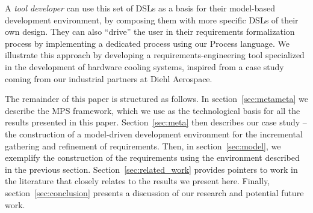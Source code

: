 A \emph{tool developer} can use this set of DSLs as a basis for their
model-based development environment, by composing them with more specific DSLs
of their own design.
They can also ``drive'' the user in their requirements formalization process by
implementing a dedicated process using our \textsf{Process} language.
We illustrate this approach by developing a requirements-engineering tool
specialized in the development of hardware cooling systems, inspired from a case
study coming from our industrial partners at Diehl Aerospace.


The remainder of this paper is structured as follows.  In
section~\ref{sec:metameta} we describe the MPS framework, which we use as the
technological basis for all the results presented in this paper.
Section~\ref{sec:meta} then describes our case study -- the construction of a
model-driven development environment for the incremental gathering and
refinement of requirements. Then, in section~\ref{sec:model}, we exemplify the
construction of the requirements using the environment described in the previous
section. Section~\ref{sec:related_work} provides pointers to work in the
literature that closely relates to the results we present here. Finally,
section~\ref{sec:conclusion} presents a discussion of our research and potential
future work.
\vspace{-.5cm}

